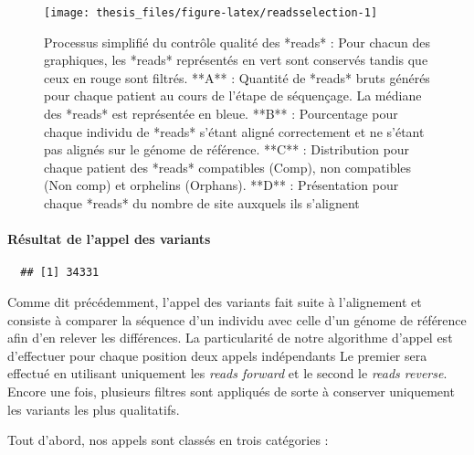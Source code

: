 \documentclass[12pt,twoside]{reedthesis}
\theoremstyle{definition}
\theoremstyle{definition}
\theoremstyle{remark}
\begin{document}
  \begin{figure}
  
  {\centering \texttt{[image: thesis\_files/figure-latex/readsselection-1]} 
  
  }
  
  \caption[Processus simplifié du contrôle qualité des *reads*]{Processus simplifié du contrôle qualité des *reads* : Pour chacun des graphiques, les *reads* représentés en vert sont conservés tandis que ceux en rouge sont filtrés. **A** : Quantité de *reads* bruts générés pour chaque patient au cours de l'étape de séquençage. La médiane des *reads* est représentée en bleue. **B** : Pourcentage pour chaque individu de *reads* s'étant aligné correctement et ne s'étant pas alignés sur le génome de référence. **C** : Distribution pour chaque patient des *reads* compatibles (Comp), non compatibles (Non comp) et orphelins (Orphans). **D** : Présentation pour chaque *reads* du nombre de site auxquels ils s'alignent}\label{fig:readsselection}
  \end{figure}
  
  \newpage
  
  \paragraph{Résultat de l'appel des
  variants}\label{resultat-de-lappel-des-variants}
  
  \begin{verbatim}
  ## [1] 34331
  \end{verbatim}
  
  Comme dit précédemment, l'appel des variants fait suite à l'alignement
  et consiste à comparer la séquence d'un individu avec celle d'un génome
  de référence afin d'en relever les différences. La particularité de
  notre algorithme d'appel est d'effectuer pour chaque position deux
  appels indépendants Le premier sera effectué en utilisant uniquement les
  \emph{reads forward} et le second le \emph{reads reverse}. Encore une
  fois, plusieurs filtres sont appliqués de sorte à conserver uniquement
  les variants les plus qualitatifs.
  
  Tout d'abord, nos appels sont classés en trois catégories :
  
\end{document}
